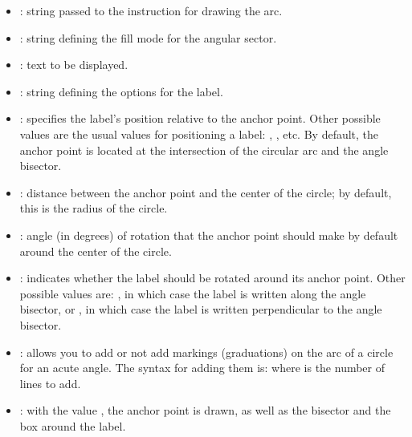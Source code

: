 \begin{itemize}
    \item {}: string passed to the \drawcmd instruction for drawing the arc.
    \item {}: string defining the fill mode for the angular sector.
    \item {}: text to be displayed.
    \item {}: string defining the options for the label.
    \item {}: specifies the label's position relative to the anchor point. Other possible values ​​are the usual values ​​for positioning a label: , , etc. By default, the anchor point is located at the intersection of the circular arc and the angle bisector.
    \item {}: distance between the anchor point and the center of the circle; by default, this is the radius  of the circle.
    \item {}: angle (in degrees) of rotation that the anchor point should make by default around the center of the circle.
    \item {}: indicates whether the label should be rotated around its anchor point. Other possible values ​​are: , in which case the label is written along the angle bisector, or , in which case the label is written perpendicular to the angle bisector.
    \item {}: allows you to add or not add markings (graduations) on the arc of a circle for an acute angle. The syntax for adding them is:  where  is the number of lines to add.
    \item {}: with the value \true, the anchor point is drawn, as well as the bisector and the box around the label.
\end{itemize}

